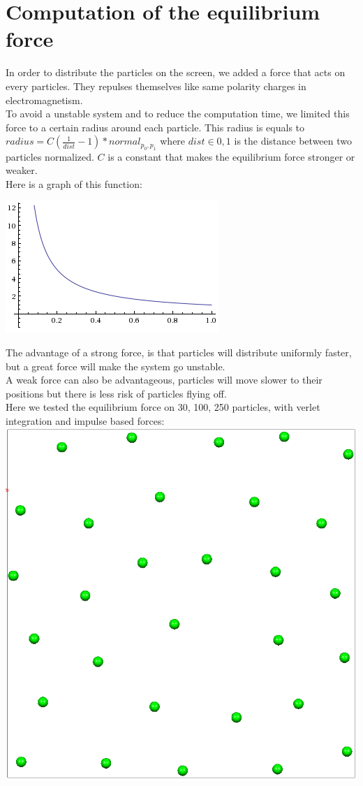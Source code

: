 \documentclass[10pt,a4paper]{report}
\begin{document}
\section*{Computation of the equilibrium force}
In order to distribute the particles on the screen, we added a force that acts on every particles. They repulses themselves like same polarity charges in electromagnetism.\\
To avoid a unstable system and to reduce the computation time, we limited this force to a certain radius around each particle. This radius is equals to\\
$radius = C(\frac{1}{dist}-1)*normal_{p_0,p_1}$ where $dist \in {0, 1}$ is the distance between two particles normalized. $C$ is a constant that makes the equilibrium force stronger or weaker.\\
Here is a graph of this function:\\
\begin{center}
\includegraphics[scale=0.5]{graph_equib.png}\\
\end{center}
The advantage of a strong force, is that particles will distribute uniformly faster, but a great force will make the system go unstable.\\
A weak force can also be advantageous, particles will move slower to their positions but there is less risk of particles flying off.\\
Here we tested the equilibrium force on 30, 100, 250 particles, with verlet integration and impulse based forces:\\
\includegraphics[scale=0.25]{30.png}
\end{document}
